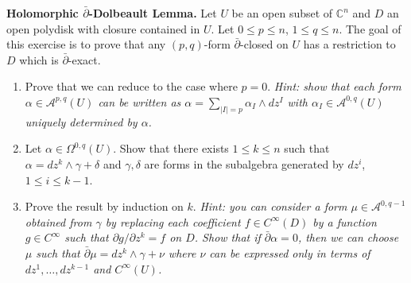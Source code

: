 \documentclass[12pt]{article}
\begin{document}
\begin{problab}{3}
\textbf{Holomorphic $\bar{\partial}$-Dolbeault Lemma.} Let $U$ be an open subset of $\mathbb{C}^n$ and $D$ an open polydisk with closure contained in $U$. Let $0 \le p \le n$, $1 \le q \le n$. The goal of this exercise is to prove that any $(p, q)$-form $\bar{\partial}$-closed on $U$ has a restriction to $D$ which is $\bar{\partial}$-exact.

\begin{enumerate}
    \item Prove that we can reduce to the case where $p = 0$. \textit{Hint: show that each form $\alpha \in \mathcal{A}^{p,q}(U)$ can be written as $\alpha = \sum_{|I|=p} \alpha_I \wedge dz^I$ with $\alpha_I \in \mathcal{A}^{0,q}(U)$ uniquely determined by $\alpha$.}

    \item Let $\alpha \in \Omega^{0,q}(U)$. Show that there exists $1 \le k \le n$ such that $\alpha = dz^k \wedge \gamma + \delta$ and $\gamma, \delta$ are forms in the subalgebra generated by $dz^i$, $1 \le i \le k - 1$.

    \item Prove the result by induction on $k$. \textit{Hint: you can consider a form $\mu \in \mathcal{A}^{0,q-1}$ obtained from $\gamma$ by replacing each coefficient $f \in C^\infty(D)$ by a function $g \in C^\infty$ such that $\partial g/\partial z^k = f$ on $D$. Show that if $\bar{\partial}\alpha = 0$, then we can choose $\mu$ such that $\bar{\partial}\mu = dz^k \wedge \gamma + \nu$ where $\nu$ can be expressed only in terms of $dz^1, \dots, dz^{k-1}$ and $C^\infty(U)$.}
\end{enumerate}
\end{problab}
\begin{solu}

\end{solu}
\newpage
\end{document}
